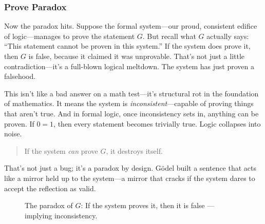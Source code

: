 \vspace{1em}


\subsubsection{Prove Paradox} 

Now the paradox hits. Suppose the formal system—our proud, consistent edifice of logic—manages to prove the statement \( G \). But recall what \( G \) actually says: “This statement cannot be proven in this system.” If the system does prove it, then \( G \) is false, because it claimed it was unprovable. That’s not just a little contradiction—it’s a full-blown logical meltdown. The system has just proven a falsehood. 

This isn’t like a bad answer on a math test—it’s structural rot in the foundation of mathematics. It means the system is \emph{inconsistent}—capable of proving things that aren’t true. And in formal logic, once inconsistency sets in, anything can be proven. If \( 0 = 1 \), then every statement becomes trivially true. Logic collapses into noise.

\begin{quote}
If the system \emph{can} prove \( G \), it destroys itself. 
\end{quote}

That’s not just a bug; it’s a paradox by design. Gödel built a sentence that acts like a mirror held up to the system—a mirror that cracks if the system dares to accept the reflection as valid.



\vspace{1em}

\begin{figure}[H]
\centering
{}
\caption{The paradox of \( G \): If the system proves it, then it is false — implying inconsistency.}
\end{figure}

